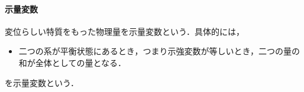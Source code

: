 %
\paragraph{示量変数}
変位らしい特質をもった物理量を示量変数という．具体的には，
\begin{itemize}
  \item 二つの系が平衡状態にあるとき，つまり示強変数が等しいとき，二つの量の和が全体としての量となる．
\end{itemize}
を示量変数という．




















%
